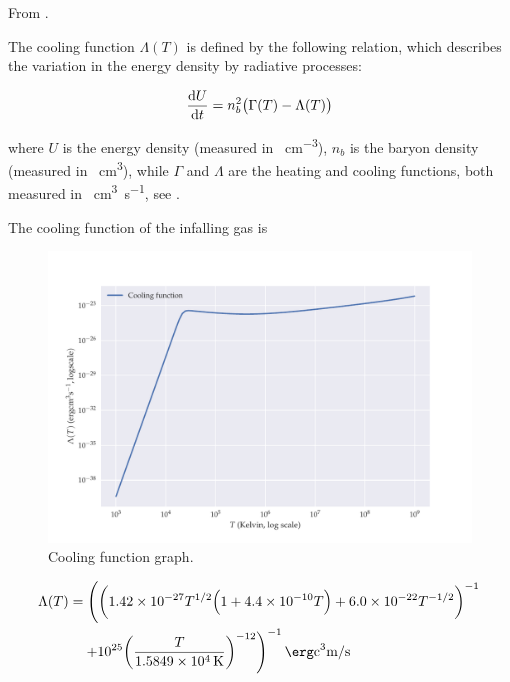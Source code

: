 \documentclass[main.tex]{subfiles}
\begin{document}
From \cite{NobiliTurollaZampieri:1991dec}.

The cooling function \(\Lambda (T)\) is defined by the following relation, which describes the variation in the energy density by radiative processes:

\begin{equation}
    \dv{U}{t} = n^2_b \qty(\Gamma(T) - \Lambda (T))
\end{equation}

where \(U\) is the energy density (measured in \si{\erg\per\cubic\centi\metre}), \(n_b\) is the baryon density (measured in \si{\per\cubic\centi\metre}), while \(\Gamma\) and \(\Lambda\) are the heating and cooling functions, both measured in \si{\erg\cubic\centi\metre\per\second}, see \cite[equation 1]{GnedinHollon:2012}.

The cooling function of the infalling gas is

\begin{figure}
    \centering
    \includegraphics[width=\textwidth]{figures/cooling_function.pdf}
    \caption{Cooling function graph.}
    \label{fig:cooling-function}
\end{figure}

\begin{equation}
    \begin{split}
    \Lambda (T) &= \left(
    \qty(
    \num{1.42e-27}T^{1/2} \qty(
    1 + \num{4.4e-10}T
    ) + \num{6.0e-22}T^{-1/2}
    )^{-1} \right. \\
    & \quad \left. + \num{e25} \qty(\frac{T}{\SI{1.5849e4}{K}})^{-12}
    \right)^{-1} \si{\erg\cubic\centi\metre\per\second}
    \end{split}
\end{equation}
\end{document}
